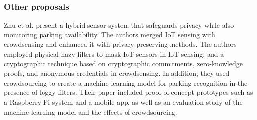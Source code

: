 \subsubsection{Other proposals}


Zhu et al. \cite{ZhuIntegrating} present a hybrid sensor system that safeguards
privacy while also monitoring parking availability. The authors merged IoT
sensing with crowdsensing and enhanced it with privacy-preserving methods.
The authors employed physical hazy filters to mask IoT sensors in IoT sensing,
and a cryptographic technique based on cryptographic commitments, zero-knowledge
proofs, and anonymous credentials in crowdsensing. In addition, they used
crowdsourcing to create a machine learning model for parking recognition
in the presence of foggy filters. Their paper included proof-of-concept
prototypes such as a Raspberry Pi system and a mobile app, as well as an
evaluation study of the machine learning model and the effects of crowdsourcing.




